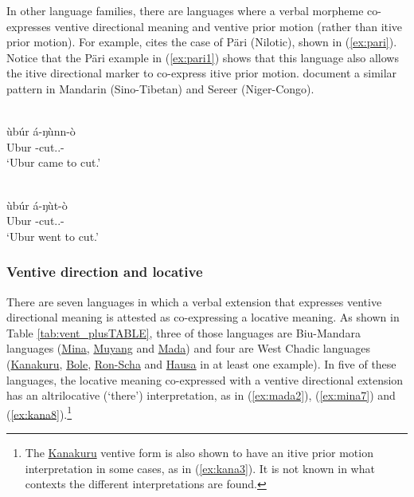 In other language families, there are languages where a verbal morpheme co-expresses ventive directional meaning and ventive prior motion (rather than itive prior motion). For example, \citet[173]{mietznerSpatialOrientationNilotic2012} cites the case of Päri (Nilotic), shown in (\ref{ex:pari}). Notice that the Päri example in (\ref{ex:pari1}) shows that this language also allows the itive directional marker to co-express itive prior motion. \citet[79--80]{christinelamarreDeicticDirectionalsRevisited2022} document a similar pattern in Mandarin (Sino-Tibetan) and Sereer (Niger-Congo).

\ea\label{ex:pari}
\ea 
{} \\
\gll  ùbúr á-ŋùnn-ò \\
Ubur -cut..- \\
\glt `Ubur came to cut.'

\ex  \label{ex:pari1}
 \\
\gll  ùbúr á-ŋùt-ò \\
Ubur -cut..- \\
\glt `Ubur went to cut.'
\z 
\z

\subsubsection{Ventive direction and locative} \label{sec:ventloc}

There are seven languages in which a verbal extension that expresses ventive directional meaning is attested as co-expressing a locative meaning. As shown in Table \ref{tab:vent_plusTABLE}, three of those languages are Biu-Mandara languages (\hyperref[mina]{Mina}, \hyperref[muya]{Muyang} and \hyperref[mada]{Mada}) and four are West Chadic languages (\hyperref[kana]{Kanakuru}, \hyperref[bole]{Bole}, \hyperref[shaa]{Ron-Scha} and \hyperref[haus]{Hausa} in at least one example). In five of these languages, the locative meaning co-expressed with a ventive directional extension has an altrilocative (`there') interpretation, as in (\ref{ex:mada2}), (\ref{ex:mina7}) and (\ref{ex:kana8}).\footnote{The \hyperref[kana]{Kanakuru} ventive form is also shown to have an itive prior motion interpretation in some cases, as in (\ref{ex:kana3}). It is not known in what contexts the different interpretations are found.}

